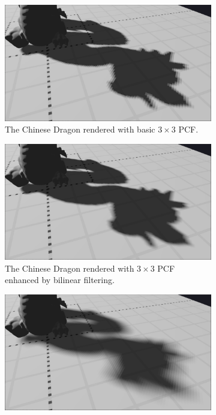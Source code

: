 \begin{figure}[h]
    \centering
    \begin{subfigure}[t]{0.45\textwidth}
		\centering
        \includegraphics[width=\textwidth]{./graf/tests/pcf/cropped/dragon_pcf_fhd_512_3x3.png}
        \caption{The Chinese Dragon rendered with basic \(3\times 3\) PCF.}
    \end{subfigure}
	\hfill
    \begin{subfigure}[t]{0.45\textwidth}
		\centering
        \includegraphics[width=\textwidth]{./graf/tests/pcf/cropped/dragon_pcf_fhd_512_3x3_bilinear.png}
        \caption{The Chinese Dragon rendered with \(3\times 3\) PCF enhanced by bilinear filtering.}
    \end{subfigure}
    \begin{subfigure}[t]{0.45\textwidth}
		\centering
        \includegraphics[width=\textwidth]{./graf/tests/pcf/cropped/dragon_pcf_fhd_512_11x11.png}

\end{subfigure}
\end{figure}
